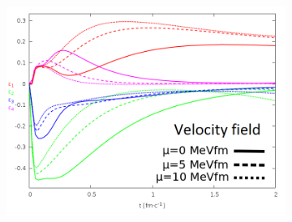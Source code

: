 \documentclass{beamer}
\begin{document}
\begin{frame}
\begin{center}
\begin{figure}[H]
\begin{subfigure}[b]{0.49\textwidth}
        	\includegraphics[width=\textwidth]{pic/res/nonrel/eps_visc_v}
	\end{subfigure}
\end{figure}
\end{center}
\end{frame}
\end{document}
